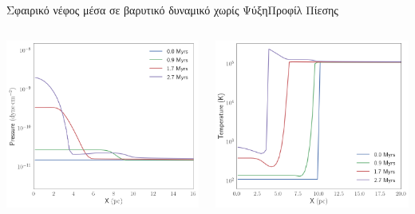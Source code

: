 \documentclass{beamer}
\begin{document}
\begin{frame}{Σφαιρικό νέφος μέσα σε βαρυτικό δυναμικό χωρίς Ψύξη}{Προφίλ Πίεσης}
\begin{columns}
	\begin{center}
		\includegraphics[width=1\linewidth]{../Document/DataImages/NoCoolGPRSprofile}
	\end{center}
	
\begin{center}
	\includegraphics[width=1\linewidth]{../Document/DataImages/NoCoolGTempprofile}
\end{center}
\end{columns}
\end{frame}
\end{document}
